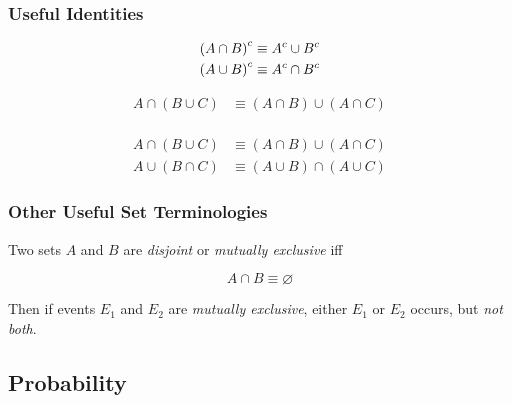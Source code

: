 \subsubsection{Useful Identities}

\begin{definition}
    \begin{align}
        {(A \cap B)}^{c} &\equiv {A}^{c} \cup {B}^{c} \\
        {(A \cup B)}^{c} &\equiv {A}^{c} \cap {B}^{c}
    \end{align}
\end{definition}

\begin{definition}
    \begin{align}
        A \cap (B \cup C) &\equiv (A \cap B) \cup (A \cap C) \\
    \end{align}
\end{definition}

\begin{definition}
    \begin{align}
        A \cap (B \cup C) &\equiv (A \cap B) \cup (A \cap C) \\
        A \cup (B \cap C) &\equiv (A \cup B) \cap (A \cup C)
    \end{align}
\end{definition}

\subsubsection{Other Useful Set Terminologies}

\begin{definition}
    Two sets $A$ and $B$ are \textit{disjoint} or \textit{mutually exclusive} iff
    
    \begin{equation}
        A \cap B \equiv \varnothing
    \end{equation}
    
    Then if events $E_1$ and $E_2$ are \textit{mutually exclusive}, either $E_1$ or $E_2$ occurs, but \textit{not both}.
\end{definition}

\subsection{Probability}


